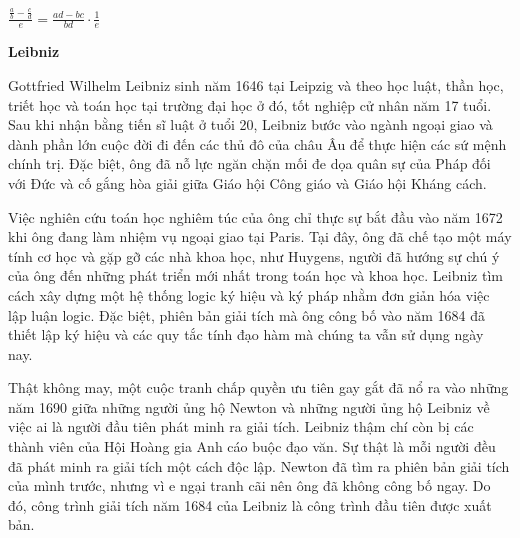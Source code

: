 \noindent
\begin{minipage}[t]{0.26\textwidth}
    \vspace{0pt}
    \vspace*{34pt}
    \begin{center}
    {\color{stewartcyan}\fontsize{9pt}{11pt}\selectfont
    $\displaystyle \frac{\frac{a}{b} - \frac{c}{d}}{e} = \frac{ad - bc}{bd} \cdot \frac{1}{e}$
    }
    \end{center}

    \vspace{24pt}
    \begin{leibnizbox}
    {\noindent\bfseries\textsf{\color{stewartgreen}\normalsize Leibniz}}\par\vspace{4pt}
    {\fontsize{7.5pt}{9.7pt}\selectfont
    \noindent Gottfried Wilhelm Leibniz sinh năm 1646 tại Leipzig và theo học luật, thần học, triết học và toán học tại trường đại học ở đó, tốt nghiệp cử nhân năm 17 tuổi. Sau khi nhận bằng tiến sĩ luật ở tuổi 20, Leibniz bước vào ngành ngoại giao và dành phần lớn cuộc đời đi đến các thủ đô của châu Âu để thực hiện các sứ mệnh chính trị. Đặc biệt, ông đã nỗ lực ngăn chặn mối đe dọa quân sự của Pháp đối với Đức và cố gắng hòa giải giữa Giáo hội Công giáo và Giáo hội Kháng cách.

    \par\vspace{4pt}
    \noindent\hspace{0.8em}Việc nghiên cứu toán học nghiêm túc của ông chỉ thực sự bắt đầu vào năm 1672 khi ông đang làm nhiệm vụ ngoại giao tại Paris. Tại đây, ông đã chế tạo một máy tính cơ học và gặp gỡ các nhà khoa học, như Huygens, người đã hướng sự chú ý của ông đến những phát triển mới nhất trong toán học và khoa học. Leibniz tìm cách xây dựng một hệ thống logic ký hiệu và ký pháp nhằm đơn giản hóa việc lập luận logic. Đặc biệt, phiên bản giải tích mà ông công bố vào năm 1684 đã thiết lập ký hiệu và các quy tắc tính đạo hàm mà chúng ta vẫn sử dụng ngày nay.

    \par\vspace{4pt}
    \noindent\hspace{0.8em}Thật không may, một cuộc tranh chấp quyền ưu tiên gay gắt đã nổ ra vào những năm 1690 giữa những người ủng hộ Newton và những người ủng hộ Leibniz về việc ai là người đầu tiên phát minh ra giải tích. Leibniz thậm chí còn bị các thành viên của Hội Hoàng gia Anh cáo buộc đạo văn. Sự thật là mỗi người đều đã phát minh ra giải tích một cách độc lập. Newton đã tìm ra phiên bản giải tích của mình trước, nhưng vì e ngại tranh cãi nên ông đã không công bố ngay. Do đó, công trình giải tích năm 1684 của Leibniz là công trình đầu tiên được xuất bản.
    }
    \end{leibnizbox}
\end{minipage}%
